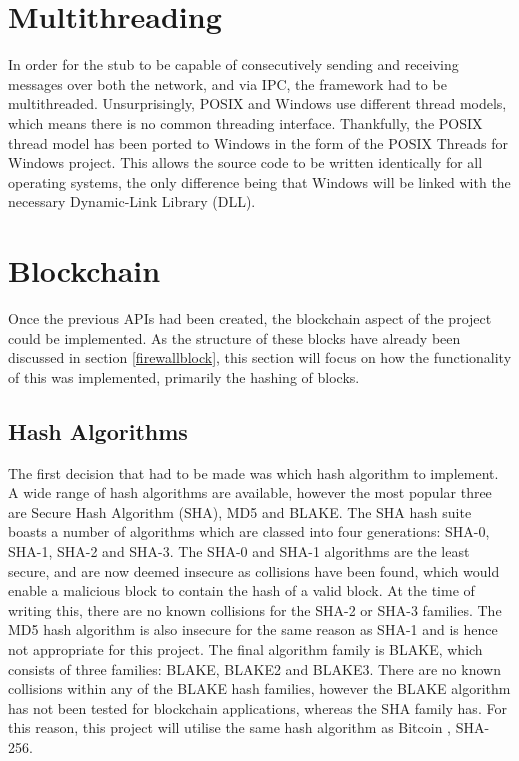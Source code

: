 \documentclass[a4paper, 11pt]{report}
\begin{document}
\section{Multithreading}
In order for the \gls{stub} to be capable of consecutively sending and receiving messages over both the network, and via \acrshort{IPC}, the framework had to be multithreaded. Unsurprisingly, \acrshort{POSIX} and Windows use different thread models, which means there is no common threading interface. Thankfully, the \acrshort{POSIX} thread model has been ported to Windows in the form of the \acrshort{POSIX} Threads for Windows project\cite{pthread}. This allows the source code to be written identically for all operating systems, the only difference being that Windows will be linked with the necessary Dynamic-Link Library (DLL).

\section{Blockchain}
Once the previous \acrshort{API}s had been created, the \gls{blockchain} aspect of the project could be implemented. As the structure of these blocks have already been discussed in section \ref{firewallblock}, this section will focus on how the functionality of this was implemented, primarily the \gls{hashing} of blocks.

\subsection{Hash Algorithms} 
The first decision that had to be made was which hash algorithm to implement. A wide range of hash algorithms are available, however the most popular three are Secure Hash Algorithm (SHA), MD5 and BLAKE. The SHA hash suite boasts a number of algorithms which are classed into four generations: SHA-0, SHA-1, SHA-2 and SHA-3. The SHA-0 and SHA-1 algorithms are the least secure, and are now deemed insecure as collisions have been found, which would enable a malicious block to contain the hash of a valid block. At the time of writing this, there are no known collisions for the SHA-2 or SHA-3 families. The MD5 hash algorithm is also insecure for the same reason as SHA-1 and is hence not appropriate for this project. The final algorithm family is BLAKE, which consists of three families: BLAKE, BLAKE2 and BLAKE3. There are no known collisions within any of the BLAKE hash families, however the BLAKE algorithm has not been tested for \gls{blockchain} applications, whereas the SHA family has. For this reason, this project will utilise the same hash algorithm as Bitcoin \cite{bitcoin}, SHA-256.
\end{document}

